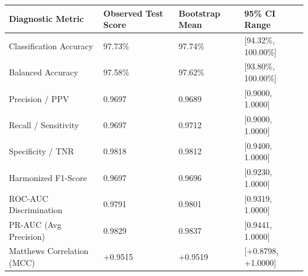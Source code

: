 \begin{tabular}{llll}
\toprule
Diagnostic Metric & Observed Test Score & Bootstrap Mean & 95\% CI Range \\
\midrule
Classification Accuracy & 97.73\% & 97.74\% & [94.32\%, 100.00\%] \\
Balanced Accuracy & 97.58\% & 97.62\% & [93.80\%, 100.00\%] \\
Precision / PPV & 0.9697 & 0.9689 & [0.9000, 1.0000] \\
Recall / Sensitivity & 0.9697 & 0.9712 & [0.9000, 1.0000] \\
Specificity / TNR & 0.9818 & 0.9812 & [0.9400, 1.0000] \\
Harmonized F1-Score & 0.9697 & 0.9696 & [0.9230, 1.0000] \\
ROC-AUC Discrimination & 0.9791 & 0.9801 & [0.9319, 1.0000] \\
PR-AUC (Avg Precision) & 0.9829 & 0.9837 & [0.9441, 1.0000] \\
Matthews Correlation (MCC) & +0.9515 & +0.9519 & [+0.8798, +1.0000] \\
\bottomrule
\end{tabular}
